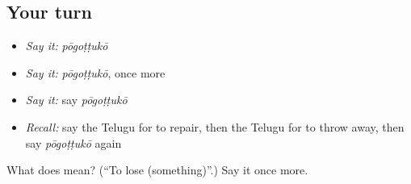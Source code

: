 \subsection*{Your turn}
\begin{itemize}
\raggedright
  \item \emph{Say it:} \emph{pōgoṭṭukō}
  \item \emph{Say it:} \emph{pōgoṭṭukō}, once more
  \item \emph{Say it:} say \emph{pōgoṭṭukō}
  \item \emph{Recall:} say the Telugu for to repair, then the Telugu for to throw away, then say \emph{pōgoṭṭukō} again
\end{itemize}

\begin{tcolorbox}[breakable,colback=teal!4,colframe=teal!35!black,title={Before you move on}]
What does  mean? (\textquotedblleft{}To lose (something)\textquotedblright{}.) Say it once more.
\end{tcolorbox}
